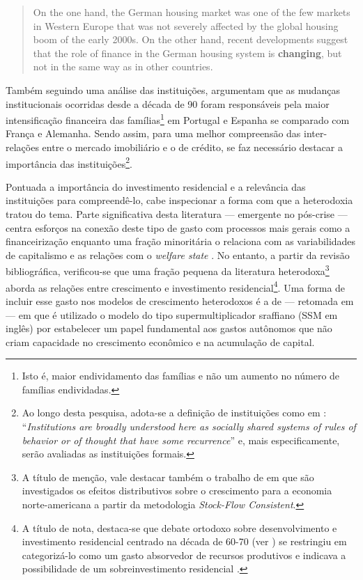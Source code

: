 \begin{quote}
On the one hand, the German housing
market was one of the few markets in Western Europe that was not severely affected by the
global housing boom of the early 2000s. On the other hand, recent developments suggest
that the role of finance in the German housing system is \textbf{changing}, but not in the same way as
in other countries. \cite[p.~969, grifos adicionados]{wijburg_alternative_2017}
\end{quote}
Também seguindo uma análise das instituições, \textcite{van_gunten_varieties_2018} argumentam que as mudanças institucionais ocorridas desde a década de 90 foram responsáveis pela maior intensificação financeira das famílias\footnote{Isto é, maior endividamento das famílias e não um aumento no número de famílias endividadas.} em Portugal e Espanha se comparado com França e Alemanha. Sendo assim, para uma melhor compreensão das inter-relações entre o mercado imobiliário e o de crédito, se faz necessário destacar a importância das instituições\footnote{
	Ao longo desta pesquisa, adota-se a definição de instituições como em 	\textcite[p.~85]{dequech_economic_2013}: ``\textit{Institutions are broadly understood here as socially shared systems of rules of behavior or of thought that have some recurrence}'' e, mais especificamente, serão avaliadas as instituições formais.}.  


Pontuada a importância do investimento residencial e a relevância das instituições para compreendê-lo, cabe inspecionar a forma com que a heterodoxia tratou do tema. Parte significativa desta literatura  --- emergente no pós-crise --- centra esforços na conexão deste tipo de gasto com processos mais gerais como a financeirização \cites{aalbers_financialization_2008}{bibow_financialization_2010} enquanto uma fração minoritária o relaciona com as variabilidades de capitalismo e as relações com o \textit{welfare state} \cite{schwartz_politics_2009}. 
No entanto, a partir da revisão bibliográfica, verificou-se que uma fração pequena da literatura heterodoxa\footnote{
	A título de menção, vale destacar também o trabalho de \textcite{zezza_u.s._2008} em que são investigados os efeitos distributivos sobre o crescimento para a economia norte-americana a partir da metodologia \textit{Stock-Flow Consistent}.}
aborda as relações entre crescimento e investimento residencial\footnote{A título de nota, destaca-se que debate ortodoxo sobre desenvolvimento e investimento residencial centrado na década de 60-70 (ver \textcite{arku_housing_2006}) se restringiu em categorizá-lo como um gasto absorvedor de recursos produtivos e indicava  a possibilidade de um sobreinvestimento residencial \cites{solow_importance_1995}{mills_has_1987}. }. 
Uma forma de incluir esse gasto nos modelos de crescimento heterodoxos é a de \textcite{teixeira_crescimento_2015} --- retomada em \textcite{da_silveira_investimento_2019} --- em que é utilizado o modelo do tipo supermultiplicador sraffiano (SSM em inglês) por estabelecer um papel fundamental aos gastos autônomos que não criam capacidade no crescimento econômico e na acumulação de capital.



